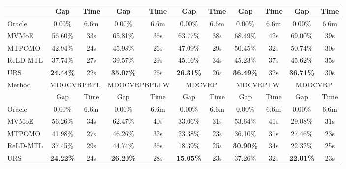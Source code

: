 \documentclass{article}
\theoremstyle{plain}
\theoremstyle{definition}
\theoremstyle{remark}
\begin{document}
\begin{table}[htbp]
{\begin{tabular}{l|cc|cc|cc|cc|cc}
          & Gap   & Time  & Gap   & Time  & Gap   & Time  & Gap   & \multicolumn{1}{c|}{Time} & Gap   & \multicolumn{1}{c}{Time} \\
    \midrule
    Oracle & 0.00\% & 6.6m  & 0.00\% & 6.6m  & 0.00\% & 6.6m  & 0.00\% & \multicolumn{1}{c|}{6.6m} & 0.00\% & \multicolumn{1}{c}{6.6m} \\
    MVMoE &  56.60\% & 33s   &  65.81\% & 36s   &  63.77\% & 38s   &  68.49\% & \multicolumn{1}{c|}{42s} &  69.00\% & \multicolumn{1}{c}{39s} \\
    MTPOMO &  42.94\% & 24s   &  45.98\% & 26s   &  47.09\% & 29s   &  50.45\% & \multicolumn{1}{c|}{32s} &  50.74\% & \multicolumn{1}{c}{30s} \\
    ReLD-MTL &  37.74\% & 27s   &  39.57\% & 29s   &  45.16\% & 34s   &  45.23\% & \multicolumn{1}{c|}{37s} &  45.62\% & \multicolumn{1}{c}{35s} \\
    URS   &  \cellcolor[HTML]{D0CECE}\textbf{24.44\%} & 22s   &  \cellcolor[HTML]{D0CECE}\textbf{35.07\%} & 26s   &  \cellcolor[HTML]{D0CECE}\textbf{26.31\%} & 26s   &  \cellcolor[HTML]{D0CECE}\textbf{36.49\%} & \multicolumn{1}{c|}{32s} &  \cellcolor[HTML]{D0CECE}\textbf{36.71\%} & \multicolumn{1}{c}{30s} \\
    \midrule
    \midrule
    \multirow{2}[2]{*}{Method} & \multicolumn{2}{c|}{MDOCVRPBPL} & \multicolumn{2}{c|}{MDOCVRPBPLTW} & \multicolumn{2}{c|}{MDCVRP} & \multicolumn{2}{c|}{MDCVRPTW} & \multicolumn{2}{c}{MDOCVRP} \\
          & Gap   & Time  & Gap   & Time  & Gap   & Time  & Gap   & \multicolumn{1}{c|}{Time} & Gap   & \multicolumn{1}{c}{Time} \\
    \midrule
    Oracle & 0.00\% & 6.6m  & 0.00\% & 6.6m  & 0.00\% & 6.6m  & 0.00\% & \multicolumn{1}{c|}{6.6m} & 0.00\% & \multicolumn{1}{c}{6.6m} \\
    MVMoE &  56.26\% & 34s   &  62.47\% & 40s   &  33.06\% & 31s   & 53.64\% & \multicolumn{1}{c|}{41s} & 29.08\% & \multicolumn{1}{c}{31s} \\
    MTPOMO &  41.98\% & 27s   &  46.26\% & 32s   &  23.38\% & 23s   & 36.10\% & \multicolumn{1}{c|}{31s} & 27.46\% & \multicolumn{1}{c}{23s} \\
    ReLD-MTL &  37.45\% & 29s   &  44.74\% & 36s   &  18.39\% & 25s   & \cellcolor[HTML]{D0CECE}\textbf{30.90\%} & \multicolumn{1}{c|}{34s} & 22.32\% & \multicolumn{1}{c}{25s} \\
    URS   &  \cellcolor[HTML]{D0CECE}\textbf{24.22\%} & 24s   &  \cellcolor[HTML]{D0CECE}\textbf{26.20\%} & 28s   &  \cellcolor[HTML]{D0CECE}\textbf{15.05\%} & 23s   & 37.26\% & \multicolumn{1}{c|}{32s} & \cellcolor[HTML]{D0CECE}\textbf{22.01\%} & \multicolumn{1}{c}{23s} \\

\end{tabular}}
\end{table}
\end{document}
